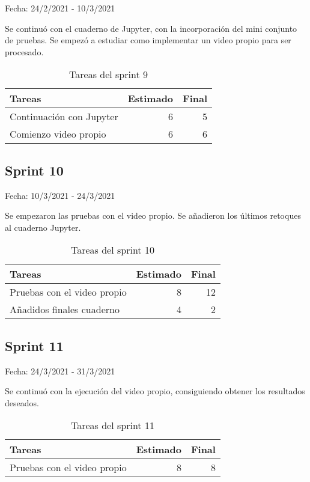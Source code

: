     Fecha: 24/2/2021 - 10/3/2021
    
    Se continuó con el cuaderno de Jupyter, con la incorporación del mini conjunto de pruebas. Se empezó a estudiar 
    como implementar un video propio para ser procesado.
    
    \begin{table}[H]
    	 \begin{tabularx}{\linewidth}{X r r}
    	 	\toprule \textbf{Tareas} & \textbf{Estimado} & \textbf{Final}\\
    	 	\toprule
         	Continuación con Jupyter  & 6 & 5 \\
        	Comienzo video propio & 6 & 6 \\
    	 	\bottomrule
    	 \end{tabularx}
    	 \caption{Tareas del sprint 9}
    \end{table}
    
    \subsection{Sprint 10}
    
    Fecha: 10/3/2021 - 24/3/2021
        
    Se empezaron las pruebas con el video propio. Se añadieron los últimos retoques al cuaderno Jupyter.
    
    \begin{table}[H]
    	 \begin{tabularx}{\linewidth}{X r r}
    	 	\toprule \textbf{Tareas} & \textbf{Estimado} & \textbf{Final}\\
    	 	\toprule
         	Pruebas con el video propio  & 8 & 12 \\
	        Añadidos finales cuaderno & 4 & 2 \\
    	 	\bottomrule
    	 \end{tabularx}
    	 \caption{Tareas del sprint 10}
    \end{table}

\subsection{Sprint 11}

    Fecha: 24/3/2021 - 31/3/2021
    
    Se continuó con la ejecución del video propio, consiguiendo obtener los resultados deseados.
    
    \begin{table}[H]
    	 \begin{tabularx}{\linewidth}{X r r}
    	 	\toprule \textbf{Tareas} & \textbf{Estimado} & \textbf{Final}\\
    	 	\toprule
         	Pruebas con el video propio  & 8 & 8 \\
    	 	\bottomrule
    	 \end{tabularx}
    	 \caption{Tareas del sprint 11}
    \end{table}

